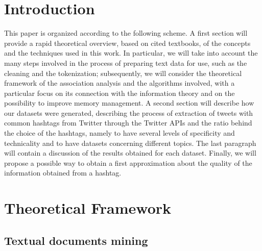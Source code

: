 \documentclass[12pt,%
               a4paper,%
               oneside,openany,%
               titlepage,%
               headinclude,footinclude,%
               BCOR5mm,%
               cleardoublepage=empty,%
               tablecaptionabove,%
               floatperchapter,
               ]{scrreprt}                 %
\begin{document}
\chapter{Introduction}
This paper is organized according to the following scheme. A first section will provide a rapid theoretical overview, based on cited textbooks, of the concepts and the techniques used in this work. In particular, we will take into account the many steps involved in the process of preparing text data for use, such as the cleaning and the tokenization; subsequently, we will consider the theoretical framework of the association analysis and the algorithms involved, with a particular focus on its connection with the information theory and on the possibility to improve memory management.  A second section will describe how our datasets were generated, describing the process of extraction of tweets with common hashtags from Twitter through the Twitter APIs and the ratio behind the choice of the hashtags, namely to have several levels of specificity and technicality and to have datasets concerning different topics. The last paragraph will contain a discussion of the results obtained for each dataset. Finally, we will propose a possible way to obtain a first approximation about the quality of the information obtained from a hashtag.

\chapter{Theoretical Framework}
\section{Textual documents mining}
\end{document}
